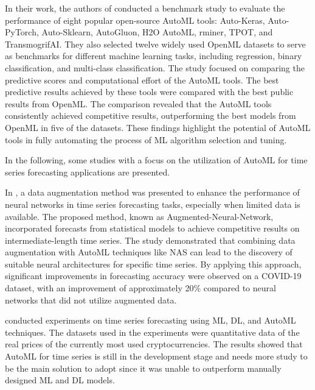 In their work, the authors of \cite{9534091} conducted a benchmark study to evaluate the performance of eight popular open-source AutoML tools: Auto-Keras, Auto-PyTorch, Auto-Sklearn, AutoGluon, H2O AutoML, rminer, TPOT, and TransmogrifAI.
They also selected twelve widely used OpenML datasets to serve as benchmarks for different machine learning tasks, including regression, binary classification, and multi-class classification.
The study focused on comparing the predictive scores and computational effort of the AutoML tools.
The best predictive results achieved by these tools were compared with the best public results from OpenML.
The comparison revealed that the AutoML tools consistently achieved competitive results, outperforming the best models from OpenML in five of the datasets.
These findings highlight the potential of AutoML tools in fully automating the process of ML algorithm selection and tuning.

In the following, some studies with a focus on the utilization of AutoML for time series forecasting applications are presented.

In \cite{9564380}, a data augmentation method was presented to enhance the performance of neural networks in time series forecasting tasks, especially when limited data is available.
The proposed method, known as Augmented-Neural-Network, incorporated forecasts from statistical models to achieve competitive results on intermediate-length time series.
The study demonstrated that combining data augmentation with AutoML techniques like NAS can lead to the discovery of suitable neural architectures for specific time series.
By applying this approach, significant improvements in forecasting accuracy were observed on a COVID-19 dataset, with an improvement of approximately 20\% compared to neural networks that did not utilize augmented data.

\cite{su142215292} conducted experiments on time series forecasting using ML, DL, and AutoML techniques.
The datasets used in the experiments were quantitative data of the real prices of the currently most used cryptocurrencies.
The results showed that AutoML for time series is still in the development stage and needs more study to be the main solution to adopt since it was unable to outperform manually designed ML and DL models.


